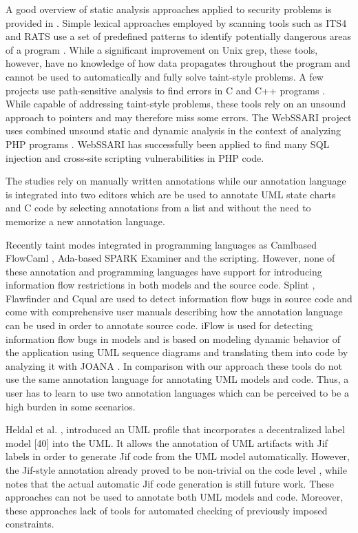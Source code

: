 A good overview of static analysis approaches applied to security problems is provided in  \cite{ref_81_chess2004static}. Simple lexical approaches employed by scanning tools such as ITS4 and RATS use a set of predefined patterns to identify potentially dangerous areas of a program \cite{ref_82_wilander2002comparison}. While a significant improvement on Unix grep, these tools, however, have no knowledge of how data propagates throughout the program and cannot be used to automatically and fully solve taint-style problems.
A few projects use path-sensitive analysis to find errors in C and C++ programs \cite{ref_83_bush2000static,ref_84_hallem2002system,ref_85_livshits2003tracking}. While capable of addressing taint-style problems, these tools rely on an unsound approach to pointers and may therefore miss some errors. The WebSSARI project uses combined unsound static and dynamic analysis in the context of analyzing PHP programs \cite{ref_75_huang2004securing}. WebSSARI has successfully been applied to find many SQL injection and cross-site scripting vulnerabilities in PHP code.

 The studies rely on manually
written annotations while our annotation language is integrated
into two editors which are be used to annotate UML state
charts and C code by selecting annotations from a list and
without the need to memorize a new annotation language.

Recently taint modes integrated in programming languages as Camlbased FlowCaml \cite{ref_32_simonet:report}, Ada-based SPARK Examiner \cite{ref_31_chapman:enforcing} and the scripting. However, none of these annotation and programming languages have support for introducing information flow
restrictions in both models and the source code.
Splint \cite{ref_30_david:splint}, Flawfinder \cite{ref_29_wheeler:flawfinder} and Cqual \cite{ref_28_umesh:cqual} are used to
detect information flow bugs in source code and come with
comprehensive user manuals describing how the annotation
language can be used in order to annotate source code.
iFlow \cite{ref_27_iflow:kuzman} is used for detecting information flow bugs in
models and is based on modeling dynamic behavior of the
application using UML sequence diagrams and translating
them into code by analyzing it with JOANA \cite{ref_26_kit:joana}. In comparison with our approach these tools do not use the same
annotation language for annotating UML models and code.
Thus, a user has to learn to use two annotation languages
which can be perceived to be a high burden in some scenarios.


 Heldal et al. \cite{ref_25_heldal:bridging}, \cite{ref_23_heldal:supporting} introduced an
UML profile that incorporates a decentralized label model [40]
into the UML. It allows the annotation of UML artifacts with
Jif \cite{ref_24_myers:descentrelized} labels in order to generate Jif code from the UML
model automatically. However, the Jif-style annotation already
proved to be non-trivial on the code level \cite{ref_22_preibusch2011information}, while \cite{ref_23_heldal:supporting}
notes that the actual automatic Jif code generation is still future
work. These approaches can not be used to annotate both UML
models and code. Moreover, these approaches lack of tools for
automated checking of previously imposed constraints.